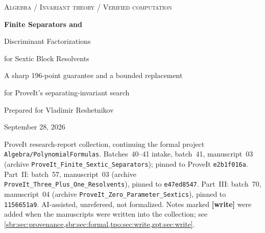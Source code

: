 \documentclass[11pt,letterpaper]{article}
\numberwithin{equation}{section}
\theoremstyle{definition}
\theoremstyle{remark}
\DeclareMathOperator{\disc}{disc}
\newcommand{\Rtwo}{R_{2,f}}
\newcommand{\Rthree}{R_{3,f}}
\newcommand{\repo}{\texttt{ProveIt}}
\newcommand{\src}[1]{\texttt{\nolinkurl{#1}}}
\begin{document}
\hypersetup{pageanchor=false}
\begin{titlepage}
\vspace*{0in}
{\color{MidnightBlue}\large\scshape Algebra \; / \; Invariant theory \; / \; Verified computation\par}
\vspace{0.18in}
{\Huge\bfseries Finite Separators and\par Discriminant Factorizations\par for Sextic Block Resolvents\par}
\vspace{0.18in}
{\Large A sharp 196-point guarantee and a bounded replacement\par for ProveIt's separating-invariant search\par}
\vspace{0.2in}
{\large Prepared for Vladimir Reshetnikov\par}
{\large September 28, 2026\par}
\vspace{0.12in}
{\footnotesize ProveIt research-report collection, continuing the formal
project \src{Algebra/PolynomialFormulas}. Batches~40--41 intake, batch~41,
manuscript~03 (archive \src{ProveIt_Finite_Sextic_Separators}); pinned to
ProveIt \src{e2b1f016a}. Part~II: batch~57, manuscript~03 (archive
\src{ProveIt_Three_Plus_One_Resolvents}), pinned to \src{e47ed8547}. Part~III: batch~70, manuscript~04 (archive
\src{ProveIt_Zero_Parameter_Sextics}), pinned to \src{1156651a9}.
AI-assisted, unrefereed, not formalized. Notes marked \textbf{[write]} were
added when the manuscripts were written into the collection; see
\cref{sbr:sec:provenance,sbr:sec:formal,tpo:sec:write,zpt:sec:write}.\par}
\vspace{0.16in}
\begin{abstract}
The sextic radical-solvability development in \repo\ uses terminating but
unbounded search to specialize two block-partition descriptors. We replace
that search, at the level of an ordinary mathematical proof, by a single
explicit parameter range. For every separable sextic in characteristic zero,
one of the integers $1,\ldots,196$ separates all fifteen pair partitions and
all ten triple partitions simultaneously. The underlying descriptors compress
to quadratics and linears. Their collisions are controlled by three invariant
polynomials $Q_f,U_f,L_f$, with degrees at most $30,120,45$, and we prove
\[
 \disc_Z\Rtwo=\disc(f)^6Q_f^6U_f^2,
 \qquad
 \disc_Z\Rthree=\disc(f)^3L_f^2.
\]
\end{abstract}
\end{titlepage}
\end{document}
